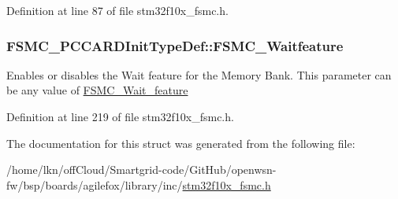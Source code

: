 Definition at line 87 of file stm32f10x\+\_\+fsmc.\+h.

\subsubsection[{\texorpdfstring{F\+S\+M\+C\+\_\+\+Waitfeature}{FSMC_Waitfeature}}]{ F\+S\+M\+C\+\_\+\+P\+C\+C\+A\+R\+D\+Init\+Type\+Def\+::\+F\+S\+M\+C\+\_\+\+Waitfeature}\hypertarget{struct_f_s_m_c___p_c_c_a_r_d_init_type_def_a3ffd8c627ffe3ac90dfbfe93a8b97c26}{}\label{struct_f_s_m_c___p_c_c_a_r_d_init_type_def_a3ffd8c627ffe3ac90dfbfe93a8b97c26}
Enables or disables the Wait feature for the Memory Bank. This parameter can be any value of \hyperlink{group___f_s_m_c___wait__feature}{F\+S\+M\+C\+\_\+\+Wait\+\_\+feature} 

Definition at line 219 of file stm32f10x\+\_\+fsmc.\+h.



The documentation for this struct was generated from the following file\+:\begin{DoxyCompactItemize}
\item 
/home/lkn/off\+Cloud/\+Smartgrid-\/code/\+Git\+Hub/openwsn-\/fw/bsp/boards/agilefox/library/inc/\hyperlink{agilefox_2library_2inc_2stm32f10x__fsmc_8h}{stm32f10x\+\_\+fsmc.\+h}\end{DoxyCompactItemize}
